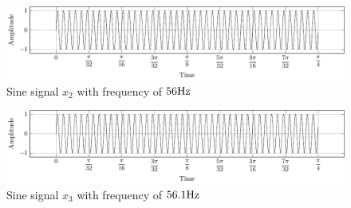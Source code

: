 \documentclass[../../course]{subfiles}
\begin{document}
\begin{figure} [H]
    \centering
     {
        \includegraphics[height = 0.8\textheight] {tikzpics/plotSeqX2.pdf}
    }
     {Sine signal $x_{2}$ with frequency of $\freqXTwo \si{Hz}$}
    \label{plt:seqx2}
\end{figure}

\begin{figure} [H]
    \centering
     {
        \includegraphics[height = 0.8\textheight] {tikzpics/plotSeqX3.pdf}
    }
     {Sine signal $x_{3}$ with frequency of $\freqXThree \si{Hz}$}
    \label{plt:seqx3}
\end{figure}
\end{document}
